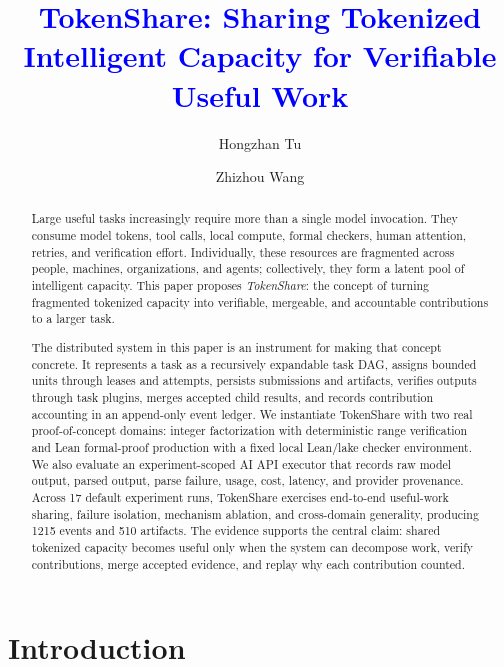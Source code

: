 \documentclass{article}
\title{\textcolor{blue}{TokenShare: Sharing Tokenized Intelligent Capacity for Verifiable Useful Work}}
\author{Hongzhan Tu \and Zhizhou Wang}
\theoremstyle{plain}
\begin{document}
\maketitle

\begin{abstract}
{\color{blue}
Large useful tasks increasingly require more than a single model invocation. They consume model tokens, tool calls, local compute, formal checkers, human attention, retries, and verification effort. Individually, these resources are fragmented across people, machines, organizations, and agents; collectively, they form a latent pool of intelligent capacity. This paper proposes \emph{TokenShare}: the concept of turning fragmented tokenized capacity into verifiable, mergeable, and accountable contributions to a larger task.

The distributed system in this paper is an instrument for making that concept concrete. It represents a task as a recursively expandable task DAG, assigns bounded units through leases and attempts, persists submissions and artifacts, verifies outputs through task plugins, merges accepted child results, and records contribution accounting in an append-only event ledger. We instantiate TokenShare with two real proof-of-concept domains: integer factorization with deterministic range verification and Lean formal-proof production with a fixed local Lean/lake checker environment. We also evaluate an experiment-scoped AI API executor that records raw model output, parsed output, parse failure, usage, cost, latency, and provider provenance. Across 17 default experiment runs, TokenShare exercises end-to-end useful-work sharing, failure isolation, mechanism ablation, and cross-domain generality, producing 1215 events and 510 artifacts. The evidence supports the central claim: shared tokenized capacity becomes useful only when the system can decompose work, verify contributions, merge accepted evidence, and replay why each contribution counted.
}
\end{abstract}

\section{Introduction}
\end{document}
